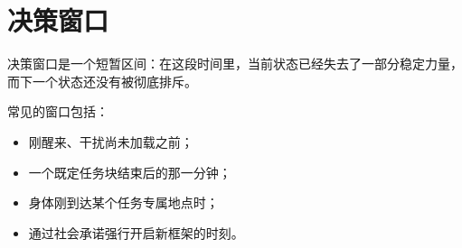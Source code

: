 \section{决策窗口}

\begin{definition}[决策窗口]
决策窗口是一个短暂区间：在这段时间里，当前状态已经失去了一部分稳定力量，而下一个状态还没有被彻底排斥。
\end{definition}

常见的窗口包括：
\begin{itemize}[nosep]
  \item 刚醒来、干扰尚未加载之前；
  \item 一个既定任务块结束后的那一分钟；
  \item 身体刚到达某个任务专属地点时；
  \item 通过社会承诺强行开启新框架的时刻。
\end{itemize}